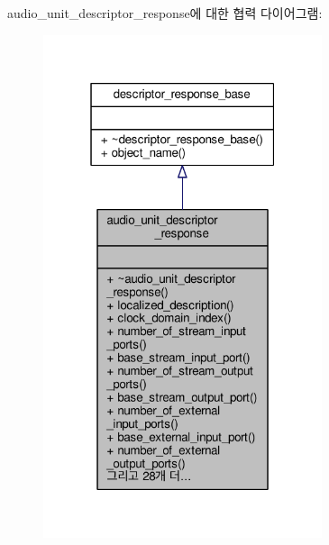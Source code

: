 audio\+\_\+unit\+\_\+descriptor\+\_\+response에 대한 협력 다이어그램\+:
\nopagebreak
\begin{figure}[H]
\begin{center}
\leavevmode
\includegraphics[width=232pt]{classavdecc__lib_1_1audio__unit__descriptor__response__coll__graph}
\end{center}
\end{figure}
